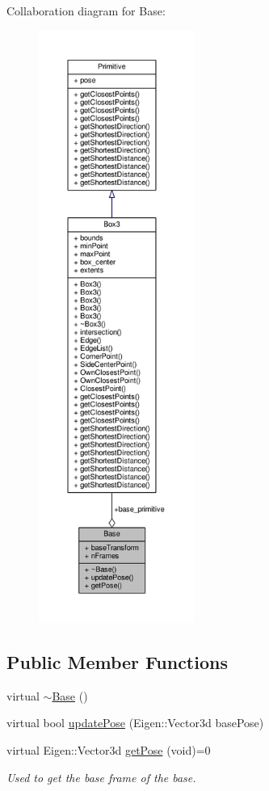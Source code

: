 Collaboration diagram for Base\+:
\nopagebreak
\begin{figure}[H]
\begin{center}
\leavevmode
\includegraphics[height=550pt]{class_base__coll__graph}
\end{center}
\end{figure}
\subsection*{Public Member Functions}
\begin{DoxyCompactItemize}
\item 
virtual \hyperlink{class_base_a722da881b6c70cfcbde9243abcfbf334}{$\sim$\+Base} ()
\item 
virtual bool \hyperlink{class_base_a5ea313e6980f658e22d14bf3020c1905}{update\+Pose} (Eigen\+::\+Vector3d base\+Pose)
\item 
virtual Eigen\+::\+Vector3d \hyperlink{class_base_ae1de47bdc7b87d0c78934946658640ee}{get\+Pose} (void)=0
\begin{DoxyCompactList}\small\item\em Used to get the base frame of the base. \end{DoxyCompactList}\end{DoxyCompactItemize}
